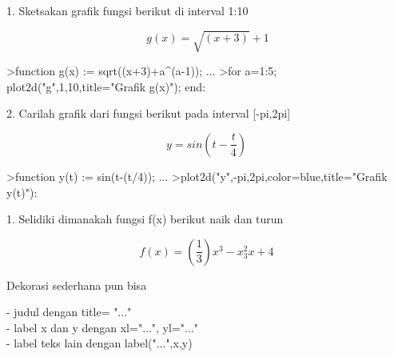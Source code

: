 \documentclass[a4paper,10pt]{article}
\begin{document}
\begin{eulernotebook}
\begin{eulercomment}
\begin{eulercomment}
\begin{eulercomment}
\begin{eulercomment}
\begin{eulercomment}
\end{eulercomment}
\begin{eulercomment}
1. Sketsakan grafik fungsi berikut di interval 1:10\\
\end{eulercomment}
\begin{eulerformula}
\[
g(x) = \sqrt{(x+3)}+1
\]
\end{eulerformula}
\begin{eulerprompt}
>function g(x) := sqrt((x+3)+a^(a-1)); ...
>for a=1:5; plot2d("g",1,10,title="Grafik g(x)"); end:
\end{eulerprompt}
\begin{eulercomment}
2. Carilah grafik dari fungsi berikut pada interval [-pi,2pi]\\
\end{eulercomment}
\begin{eulerformula}
\[
y = sin \left (t-\frac{t}{4}\right) \
\]
\end{eulerformula}
\begin{eulerprompt}
>function y(t) := sin(t-(t/4)); ...
>plot2d("y",-pi,2pi,color=blue,title="Grafik y(t)"):
\end{eulerprompt}
\eulersubheading{Kuis}
\begin{eulercomment}
1. Selidiki dimanakah fungsi f(x) berikut naik dan turun\\
\end{eulercomment}
\begin{eulerformula}
\[
f(x) = \left (\frac{1}{3}\right)x^3-x^2_3x+4 \
\]
\end{eulerformula}
\begin{eulercomment}
Dekorasi sederhana pun bisa

- judul dengan title= "..."\\
- label x dan y dengan xl="...", yl="..."\\
- label teks lain dengan label("...",x,y)


\end{eulercomment}
\end{eulercomment}
\end{eulercomment}
\end{eulercomment}
\end{eulercomment}
\end{eulernotebook}
\end{document}
